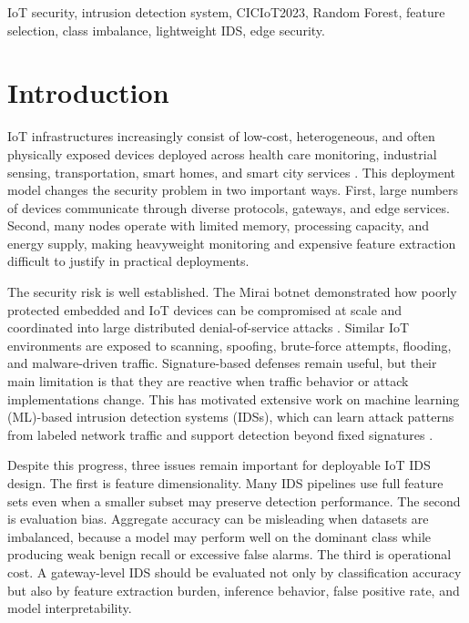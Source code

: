 \documentclass[journal]{IEEEtran}
\begin{document}
\begin{IEEEkeywords}
IoT security, intrusion detection system, CICIoT2023, Random Forest, feature selection, class imbalance, lightweight IDS, edge security.
\end{IEEEkeywords}


\section{Introduction}
IoT infrastructures increasingly consist of low-cost, heterogeneous, and often physically exposed devices deployed across health care monitoring, industrial sensing, transportation, smart homes, and smart city services \cite{alfuqaha2015iot}. This deployment model changes the security problem in two important ways. First, large numbers of devices communicate through diverse protocols, gateways, and edge services. Second, many nodes operate with limited memory, processing capacity, and energy supply, making heavyweight monitoring and expensive feature extraction difficult to justify in practical deployments.

The security risk is well established. The Mirai botnet demonstrated how poorly protected embedded and IoT devices can be compromised at scale and coordinated into large distributed denial-of-service attacks \cite{antonakakis2017mirai}. Similar IoT environments are exposed to scanning, spoofing, brute-force attempts, flooding, and malware-driven traffic. Signature-based defenses remain useful, but their main limitation is that they are reactive when traffic behavior or attack implementations change. This has motivated extensive work on machine learning (ML)-based intrusion detection systems (IDSs), which can learn attack patterns from labeled network traffic and support detection beyond fixed signatures \cite{khraisat2019survey,gyamfi2022iotids}.

Despite this progress, three issues remain important for deployable IoT IDS design. The first is feature dimensionality. Many IDS pipelines use full feature sets even when a smaller subset may preserve detection performance. The second is evaluation bias. Aggregate accuracy can be misleading when datasets are imbalanced, because a model may perform well on the dominant class while producing weak benign recall or excessive false alarms. The third is operational cost. A gateway-level IDS should be evaluated not only by classification accuracy but also by feature extraction burden, inference behavior, false positive rate, and model interpretability.
\end{document}
